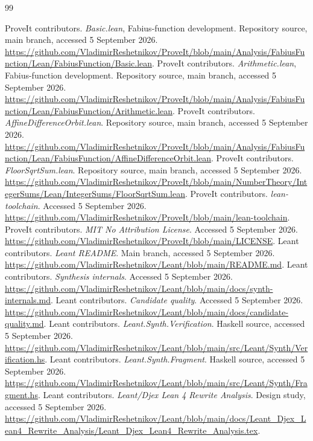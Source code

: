 \documentclass[11pt,a4paper]{article}
\theoremstyle{remark}
\begin{document}
\begin{thebibliography}{99}
\small
{} ProveIt contributors. \emph{Basic.lean}, Fabius-function development. Repository source, main branch, accessed 5 September 2026. \url{https://github.com/VladimirReshetnikov/ProveIt/blob/main/Analysis/FabiusFunction/Lean/FabiusFunction/Basic.lean}.
 ProveIt contributors. \emph{Arithmetic.lean}, Fabius-function development. Repository source, main branch, accessed 5 September 2026. \url{https://github.com/VladimirReshetnikov/ProveIt/blob/main/Analysis/FabiusFunction/Lean/FabiusFunction/Arithmetic.lean}.
 ProveIt contributors. \emph{AffineDifferenceOrbit.lean}. Repository source, main branch, accessed 5 September 2026. \url{https://github.com/VladimirReshetnikov/ProveIt/blob/main/Analysis/FabiusFunction/Lean/FabiusFunction/AffineDifferenceOrbit.lean}.
 ProveIt contributors. \emph{FloorSqrtSum.lean}. Repository source, main branch, accessed 5 September 2026. \url{https://github.com/VladimirReshetnikov/ProveIt/blob/main/NumberTheory/IntegerSums/Lean/IntegerSums/FloorSqrtSum.lean}.
 ProveIt contributors. \emph{lean-toolchain}. Accessed 5 September 2026. \url{https://github.com/VladimirReshetnikov/ProveIt/blob/main/lean-toolchain}.
 ProveIt contributors. \emph{MIT No Attribution License}. Accessed 5 September 2026. \url{https://github.com/VladimirReshetnikov/ProveIt/blob/main/LICENSE}.
 Leant contributors. \emph{Leant README}. Main branch, accessed 5 September 2026. \url{https://github.com/VladimirReshetnikov/Leant/blob/main/README.md}.
 Leant contributors. \emph{Synthesis internals}. Accessed 5 September 2026. \url{https://github.com/VladimirReshetnikov/Leant/blob/main/docs/synth-internals.md}.
 Leant contributors. \emph{Candidate quality}. Accessed 5 September 2026. \url{https://github.com/VladimirReshetnikov/Leant/blob/main/docs/candidate-quality.md}.
 Leant contributors. \emph{Leant.Synth.Verification}. Haskell source, accessed 5 September 2026. \url{https://github.com/VladimirReshetnikov/Leant/blob/main/src/Leant/Synth/Verification.hs}.
 Leant contributors. \emph{Leant.Synth.Fragment}. Haskell source, accessed 5 September 2026. \url{https://github.com/VladimirReshetnikov/Leant/blob/main/src/Leant/Synth/Fragment.hs}.
 Leant contributors. \emph{Leant/Djex Lean 4 Rewrite Analysis}. Design study, accessed 5 September 2026. \url{https://github.com/VladimirReshetnikov/Leant/blob/main/docs/Leant_Djex_Lean4_Rewrite_Analysis/Leant_Djex_Lean4_Rewrite_Analysis.tex}.

\end{thebibliography}
\end{document}
